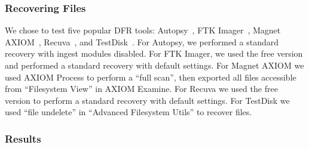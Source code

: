 \subsubsection{Recovering Files}

We chose to test five popular DFR tools: Autopsy~\cite{autopsy}, FTK Imager~\cite{ftk}, Magnet AXIOM~\cite{axiom_meta}, Recuva~\cite{recuva}, and TestDisk~\cite{testdisk}.
For Autopsy, we performed a standard recovery with ingest modules disabled.
For FTK Imager, we used the free version and performed a standard recovery with default settings.
For Magnet AXIOM we used AXIOM Process to perform a ``full scan'', then exported all files accessible from ``Filesystem View'' in AXIOM Examine.
For Recuva we used the free version to perform a standard recovery with default settings.
For TestDisk we used ``file undelete'' in ``Advanced Filesystem Utils'' to recover files.

\subsubsection{Results}

